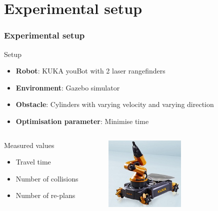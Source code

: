 \documentclass{beamer}
\begin{document}
\section{Experimental setup}
\begin{frame}
    \frametitle{\huge{Experimental setup}}
    \begin{block}{Setup}
        \begin{itemize}
            \item \textbf{Robot}: KUKA youBot with 2 laser rangefinders
            \item \textbf{Environment}: Gazebo simulator
            \item \textbf{Obstacle}: Cylinders with varying velocity and varying direction
            \item \textbf{Optimisation parameter}: Minimise time
        \end{itemize}    
    \end{block}
    \begin{columns}
            \begin{block}{Measured values}
                \begin{itemize}
                    \item Travel time
                    \item Number of collisions
                    \item Number of re-plans
                \end{itemize}
            \end{block}
        \begin{figure}[htpb]
            \centering
            \includegraphics[width=0.7\textwidth]{kuka_youBot.jpg}
        \end{figure}
    \end{columns}
\end{frame}
\end{document}
